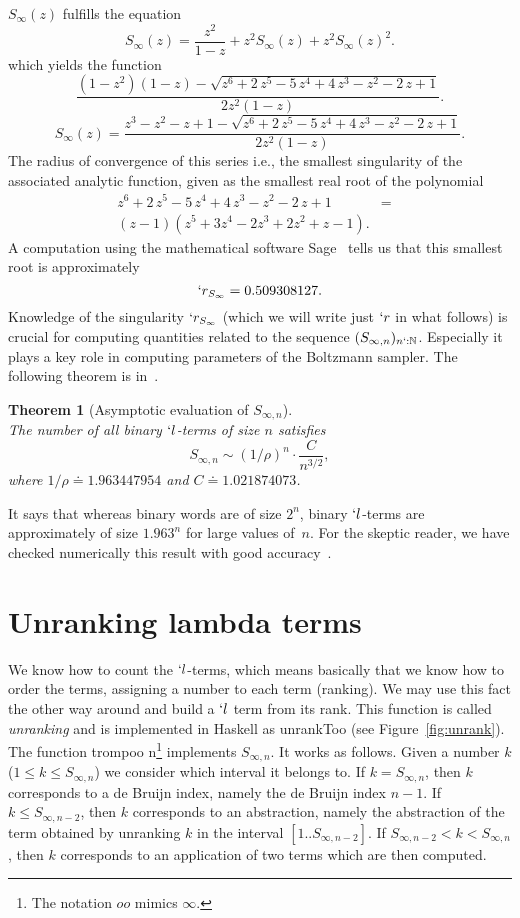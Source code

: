 \documentclass{sig-alternate}
\newcommand{\nat}{\ensuremath{\mathbb{N}}}
\newcommand{\Soo}{\ensuremath{S_{\infty}}}
\newtheorem{theorem}{Theorem}
\begin{document}
$\Soo(z)$ fulfills the equation
\[\Soo(z) = \frac{z^2}{1-z} + z^2 \Soo(z) + z^2 \Soo(z)^2.\]
which yields \ifICFP the function
\[\frac{(1-z^2)(1-z) - \sqrt{z^6 + 2\,z^5 - 5\,z^4 + 4\,z^3 - z^2 - 2\,z + 1}}{2z^2(1
  - z)}.\]
\else
\[\Soo(z) = \frac{ z^3 - z^2 - z + 1 - \sqrt{z^6 + 2\,z^5 - 5\,z^4 + 4\,z^3 - z^2 -
    2\,z + 1}}{2z^2(1 - z)}.\] \fi 
The radius of convergence of this series i.e., the
smallest singularity of the associated analytic function, given as the smallest real
root of the polynomial
\begin{eqnarray*}
  z^6 + 2\,z^5 - 5\,z^4 + 4\,z^3 - z^2 - 2\,z + 1 &=&\\
  (z-1)(z^5 + 3 z^4 - 2 z^3 + 2 z^2 + z - 1).
\end{eqnarray*}
A computation using the mathematical software
\textsf{Sage}~\cite{sage} tells us that this smallest root is approximately
\[{`r_{S_{\infty}}= 0.509308127}.\] Knowledge of the singularity $`r_{S_{\infty}}$
(which we will write just $`r$ in what follows) is crucial for computing quantities
related to the sequence $(S_{\infty,n})_{n`:\nat}$.  Especially it plays a key role
in computing parameters of the Boltzmann sampler.  The following theorem is
in~\cite{DBLP:journals/corr/GrygielL14}.
\begin{theorem}[Asymptotic evaluation of $S_{\infty,n}$]~\\
  The number of all binary \mbox{$`l$-terms} of size $n$ satisfies
  \[ S_{\infty,n} \sim (1/\rho)^n \cdot \frac{C}{n^{3/2}},\] where $1/\rho \doteq
  1.963447954$ and $C \doteq 1.021874073$.
\end{theorem}
It says that whereas binary words are of size $2^n$, binary \mbox{$`l$-terms} are
approximately of size $1.963^n$ for large values of~$n$.  For the skeptic reader, we
have checked numerically this result with good accuracy~\cite{lescanne13}.

\section{Unranking lambda terms}
\label{sec:unrank}

We know how to count the $`l$-terms, which means basically that we know how to order
the terms, assigning a number to each term (ranking).  We may use this fact the other
way around and build a $`l$ term from its rank.  This function is called
\emph{unranking} and is implemented in \textsf{Haskell} as \<unrankToo\> (see
Figure~\ref{fig:unrank}).  The function \<trompoo n\>\footnote{The notation $oo$
  mimics $\infty$.} implements $S_{\infty,n}$.  It works as follows. Given a number
$k$ ($1\le k \le S_{\infty,n}$) we consider which interval it belongs to.  If $k =
S_{\infty,n}$, then $k$ corresponds to a de Bruijn index, namely the de Bruijn index
$n-1$. If $k \le S_{\infty,n-2}$, then $k$ corresponds to an abstraction, namely the
abstraction of the term obtained by unranking $k$ in the interval
$[1..S_{\infty,n-2}]$.  If $S_{\infty,n-2} < k<S_{\infty,n}$, then $k$ corresponds to
an application of two terms which are then computed.
\end{document}
